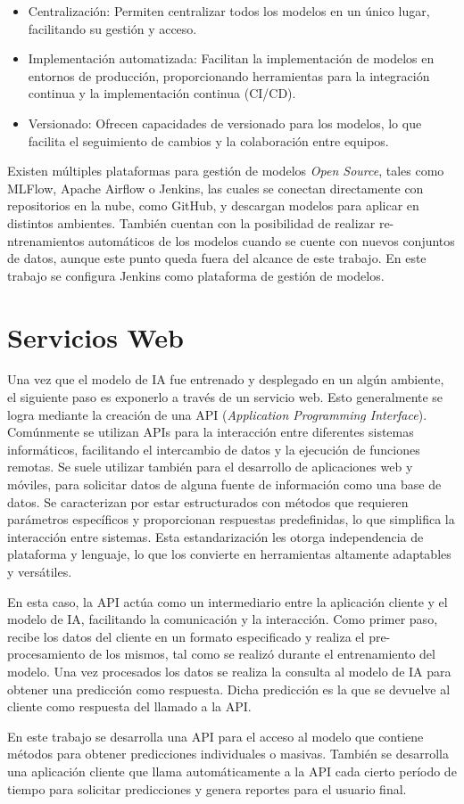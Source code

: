 \begin{itemize}
\item Centralización: Permiten centralizar todos los modelos en un único lugar, facilitando su gestión y acceso.
\item Implementación automatizada: Facilitan la implementación de modelos en entornos de producción, proporcionando herramientas para la integración continua y la implementación continua (CI/CD).
\item Versionado: Ofrecen capacidades de versionado para los modelos, lo que facilita el seguimiento de cambios y la colaboración entre equipos.
\end{itemize}

Existen múltiples plataformas para gestión de modelos \textit{Open Source}, tales como MLFlow, Apache Airflow o Jenkins, las cuales se conectan directamente con repositorios en la nube, como GitHub, y descargan modelos para aplicar en distintos ambientes. También cuentan con la posibilidad de realizar re-ntrenamientos automáticos de los modelos cuando se cuente con nuevos conjuntos de datos, aunque este punto queda fuera del alcance de este trabajo. En este trabajo se configura Jenkins como plataforma de gestión de modelos.

\section{Servicios Web}

Una vez que el modelo de IA fue entrenado y desplegado en un algún ambiente, el siguiente paso es exponerlo a través de un servicio web. Esto generalmente se logra mediante la creación de una API (\textit{Application Programming Interface}).
Comúnmente se utilizan APIs para la interacción entre diferentes sistemas informáticos, facilitando el intercambio de datos y la ejecución de funciones remotas. Se suele utilizar también para el desarrollo de aplicaciones web y móviles, para solicitar datos de alguna fuente de información como una base de datos.
Se caracterizan por estar estructurados con métodos que requieren parámetros específicos y proporcionan respuestas predefinidas, lo que simplifica la interacción entre sistemas. Esta estandarización les otorga independencia de plataforma y lenguaje, lo que los convierte en herramientas altamente adaptables y versátiles.

En esta caso, la API actúa como un intermediario entre la aplicación cliente y el modelo de IA, facilitando la comunicación y la interacción. Como primer paso, recibe los datos del cliente en un formato especificado y realiza el pre-procesamiento de los mismos, tal como se realizó durante el entrenamiento del modelo. Una vez procesados los datos se realiza la consulta al modelo de IA para obtener una predicción como respuesta. Dicha predicción es la que se devuelve al cliente como respuesta del llamado a la API.

En este trabajo se desarrolla una API para el acceso al modelo que contiene métodos para obtener predicciones individuales o masivas. También se desarrolla una aplicación cliente que llama automáticamente a la API cada cierto período de tiempo para solicitar predicciones y genera reportes para el usuario final.